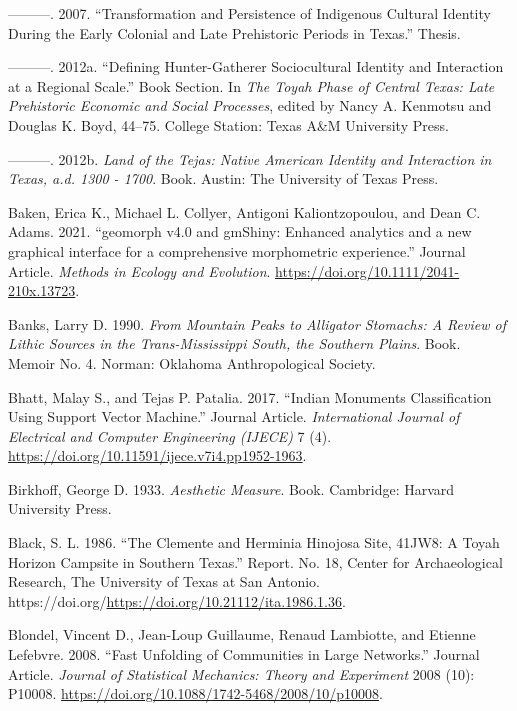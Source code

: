 \documentclass[smallextended]{svjour3}       %
\newlength{\cslhangindent}
\newlength{\cslentryspacingunit} %
\newenvironment{CSLReferences}[2] %
 {%
  \setlength{\parindent}{0pt}
  \ifodd #1
  \let\oldpar\par
  \def\par{\hangindent=\cslhangindent\oldpar}
  \fi
  \setlength{\parskip}{#2\cslentryspacingunit}
 }%
 {}
\begin{document}
\begin{CSLReferences}{1}{0}
\leavevmode{}%
---------. 2007. {``Transformation and Persistence of Indigenous
Cultural Identity During the Early Colonial and Late Prehistoric Periods
in Texas.''} Thesis.

\leavevmode{}%
---------. 2012a. {``{Defining Hunter-Gatherer Sociocultural Identity
and Interaction at a Regional Scale}.''} Book Section. In \emph{The
Toyah Phase of Central Texas: Late Prehistoric Economic and Social
Processes}, edited by Nancy A. Kenmotsu and Douglas K. Boyd, 44--75.
College Station: Texas A\&M University Press.

\leavevmode{}%
---------. 2012b. \emph{Land of the Tejas: Native American Identity and
Interaction in Texas, a.d. 1300 - 1700}. Book. Austin: The University of
Texas Press.

\leavevmode{}%
Baken, Erica K., Michael L. Collyer, Antigoni Kaliontzopoulou, and Dean
C. Adams. 2021. {``{geomorph v4.0 and gmShiny: Enhanced analytics and a
new graphical interface for a comprehensive morphometric experience}.''}
Journal Article. \emph{Methods in Ecology and Evolution}.
\url{https://doi.org/10.1111/2041-210x.13723}.

\leavevmode{}%
Banks, Larry D. 1990. \emph{From Mountain Peaks to Alligator Stomachs: A
Review of Lithic Sources in the Trans-Mississippi South, the Southern
Plains}. Book. Memoir No. 4. Norman: Oklahoma Anthropological Society.

\leavevmode{}%
Bhatt, Malay S., and Tejas P. Patalia. 2017. {``Indian Monuments
Classification Using Support Vector Machine.''} Journal Article.
\emph{International Journal of Electrical and Computer Engineering
(IJECE)} 7 (4). \url{https://doi.org/10.11591/ijece.v7i4.pp1952-1963}.

\leavevmode{}%
Birkhoff, George D. 1933. \emph{Aesthetic Measure}. Book. Cambridge:
Harvard University Press.

\leavevmode{}%
Black, S. L. 1986. {``The Clemente and Herminia Hinojosa Site, 41JW8: A
Toyah Horizon Campsite in Southern Texas.''} Report. No. 18, Center for
Archaeological Research, The University of Texas at San Antonio.
https://doi.org/\url{https://doi.org/10.21112/ita.1986.1.36}.

\leavevmode{}%
Blondel, Vincent D., Jean-Loup Guillaume, Renaud Lambiotte, and Etienne
Lefebvre. 2008. {``{Fast Unfolding of Communities in Large Networks}.''}
Journal Article. \emph{Journal of Statistical Mechanics: Theory and
Experiment} 2008 (10): P10008.
\url{https://doi.org/10.1088/1742-5468/2008/10/p10008}.


\end{CSLReferences}
\end{document}
